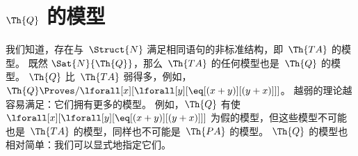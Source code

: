 \documentclass[../../../include/open-logic-section]{subfiles}
\begin{document}
\section{$\Th{Q}$ 的模型}

\begin{explain}
我们知道，存在与~$\Struct{N}$ 满足相同语句的非标准结构，即~$\Th{TA}$ 的模型。
既然 $\Sat{N}{\Th{Q}}$，那么~$\Th{TA}$ 的任何模型也是~$\Th{Q}$ 的模型。
$\Th{Q}$ 比~$\Th{TA}$ 弱得多，例如，$\Th{Q} \Proves/ \lforall[x][\lforall[y][\eq[(x +
      y)][(y+x)]]]$。
越弱的理论越容易满足：它们拥有更多的模型。
例如，$\Th{Q}$ 有使 $\lforall[x][\lforall[y][\eq[(x + y)][(y+x)]]]$ 为假的模型，但这些模型不可能也是~$\Th{TA}$ 的模型，同样也不可能是~$\Th{PA}$ 的模型。
$\Th{Q}$ 的模型也相对简单：我们可以显式地指定它们。
\end{explain}
\end{document}
